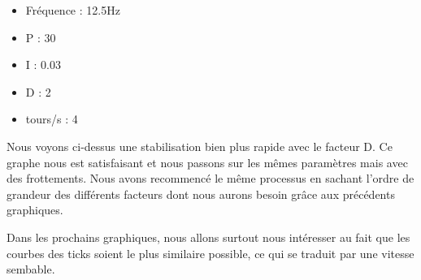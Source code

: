 \documentclass[
	a4paper,									%
	11pt,										%
	twoside,									%
	openright,									%
	notitlepage,									%
	parskip=half,								%
]{scrreprt}										%
\begin{document}
\begin{center}
    
    
    \begin{itemize}
        \item Fréquence : 12.5Hz
        \item P : 30
        \item I : 0.03
        \item D : 2
        \item tours/s : 4
    \end{itemize}
    \end{center}

Nous voyons ci-dessus une stabilisation bien plus rapide avec le facteur D. Ce graphe nous est satisfaisant et nous passons sur les mêmes paramètres 
mais avec des frottements. Nous avons recommencé le même processus en sachant l'ordre de grandeur des différents facteurs dont nous aurons besoin 
grâce aux précédents graphiques. \par

Dans les prochains graphiques, nous allons surtout nous intéresser au fait que les courbes des ticks soient le plus similaire possible, ce qui se 
traduit par une vitesse sembable. \par
\end{document}
